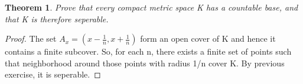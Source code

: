 \documentclass{article}
\theoremstyle{plain}
\newtheorem{theorem}{Theorem}
\theoremstyle{definition}
\begin{document}
\begin{theorem}
	Prove that every compact metric space K has a countable base, and that K is therefore seperable.
\end{theorem}

\begin{proof}
	The set $A_{x} = ( x - \frac{1}{n}, x + \frac{1}{n})$ form an open cover of K and hence it contains a finite subcover. So, for each n, there exists a finite set of points such that neighborhood around those points with radius 1/n cover K. By previous exercise, it is seperable.
\end{proof}
\end{document}
